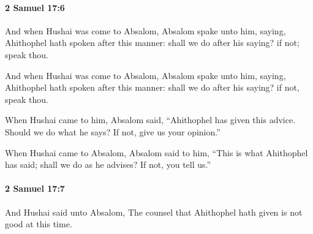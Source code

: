		\paragraph{2 Samuel 17:6} %
			\label{2SAMUEL-17-6}

			And when Hushai was come to Absalom, Absalom spake unto him, saying, Ahithophel hath spoken after this manner: shall we do after his saying? if not; speak thou.

			\begin{versebox}
					\item[BHS] 
					\item[ASV] And when Hushai was come to Absalom, Absalom spake unto him, saying, Ahithophel hath spoken after this manner: shall we do after his saying? if not, speak thou.
					\item[NIV] When Hushai came to him, Absalom said, “Ahithophel has given this advice. Should we do what he says? If not, give us your opinion.”
					\item[NRSV] When Hushai came to Absalom, Absalom said to him, “This is what Ahithophel has said; shall we do as he advises? If not, you tell us.”
			\end{versebox}

		\paragraph{2 Samuel 17:7} %
			\label{2SAMUEL-17-7}

			And Hushai said unto Absalom, The counsel that Ahithophel hath given is not good at this time.

